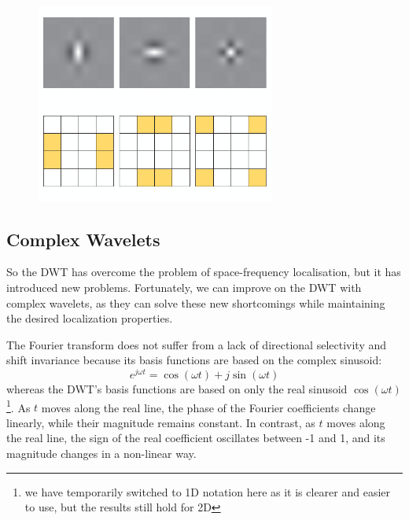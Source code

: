   \begin{figure}
    \centering
    \includegraphics[width=0.7\textwidth]{litreview/images/dwt_wavelets.png}
      \label{fig:ch2:dwt_wavelets}
  \end{figure}

\subsection{Complex Wavelets}\label{sec:ch2:complex_wavelets}
  So the DWT has overcome the problem of space-frequency localisation, but it
  has introduced new problems.  Fortunately, we can improve on the DWT with
  complex wavelets, as they can solve these new shortcomings while maintaining
  the desired localization properties. 
  
  The Fourier transform does not suffer from a lack of directional selectivity
  and shift invariance because its basis functions are based on the complex
  sinusoid: 
  \begin{equation} 
    e^{j\omega t} = \cos(\omega t) + j\sin(\omega t)
  \end{equation} 
  whereas the DWT's basis functions are based on only the real
  sinusoid $\cos(\omega t)$\footnote{we have temporarily switched to 1D
  notation here as it is clearer and easier to use, but the results still hold
  for 2D}. As $t$ moves along the real line, the phase of the
  Fourier coefficients change linearly, while their magnitude remains constant. In
  contrast, as $t$ moves along the real line, the sign of the real coefficient
  oscillates between -1 and 1, and its magnitude changes in a non-linear way.

